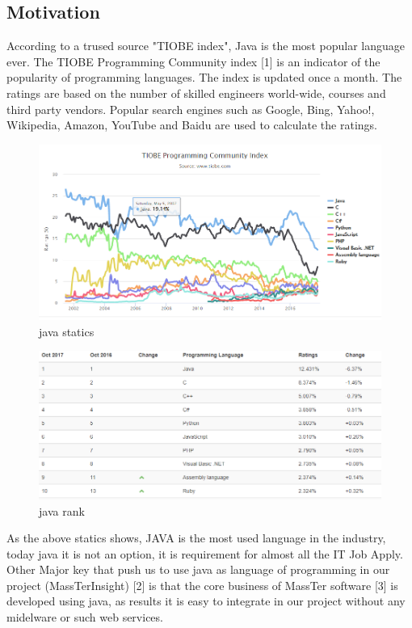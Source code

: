 \documentclass[12pt]{article}
\begin{document}
\subsection{Motivation}
According to a trused source "TIOBE index", Java is the most popular language ever.
The TIOBE Programming Community index [1] is an indicator of the popularity of programming languages. The index is updated once a month. The ratings are based on the number of skilled engineers world-wide, courses and third party vendors. Popular search engines such as Google, Bing, Yahoo!, Wikipedia, Amazon, YouTube and Baidu are used to calculate the ratings.
	\begin{figure}[h]
	\centering
	\includegraphics[width=1.0\textwidth]{Java_statics.png}
	\caption{java statics}
    \end{figure}
	\begin{figure}[h]
	\centering
	\includegraphics[width=1.0\textwidth]{Java_rank.png}
	\caption{java rank}
    \end{figure}
 As the above statics shows, JAVA is the most used language in the industry, today java it is not an option, it is requirement for almost all the IT Job Apply. \\Other Major key that push us to use java as language of programming in our project (MassTerInsight) [2] is that the core business of MassTer software [3] is developed using java, as results it is easy to integrate in our project without any midelware or such web services.    
\vspace{66mm}
\end{document}
